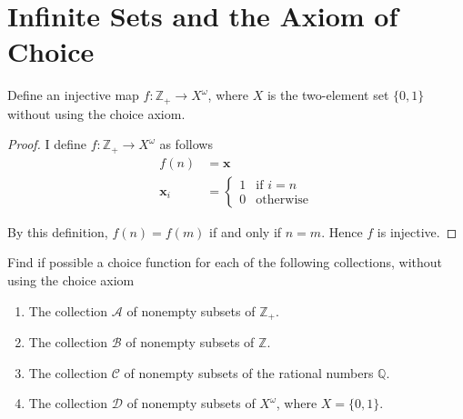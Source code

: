 \section{Infinite Sets and the Axiom of Choice}

\begin{exercise}\label{chapter1:section9:exercise1}
    Define an injective map $f: \mathbb{Z}_{+}\to X^{\omega}$, where $X$ is the two-element set $\{ 0, 1 \}$ without using the choice axiom.
\end{exercise}

\begin{proof}
    I define $f: \mathbb{Z}_{+}\to X^{\omega}$ as follows
    \begin{align*}
        f(n)           & = \mathbf{x}            \\
        \mathbf{x}_{i} & = \begin{cases}
                               1 & \text{if $i = n$} \\
                               0 & \text{otherwise}
                           \end{cases}
    \end{align*}

    By this definition, $f(n) = f(m)$ if and only if $n = m$. Hence $f$ is injective.
\end{proof}

\begin{exercise}\label{chapter1:section9:exercise2}
    Find if possible a choice function for each of the following collections, without using the choice axiom
    \begin{enumerate}[label={(\alph*)}]
        \item The collection $\mathscr{A}$ of nonempty subsets of $\mathbb{Z}_{+}$.
        \item The collection $\mathscr{B}$ of nonempty subsets of $\mathbb{Z}$.
        \item The collection $\mathscr{C}$ of nonempty subsets of the rational numbers $\mathbb{Q}$.
        \item The collection $\mathscr{D}$ of nonempty subsets of $X^{\omega}$, where $X = \{ 0, 1 \}$.
    \end{enumerate}
\end{exercise}

